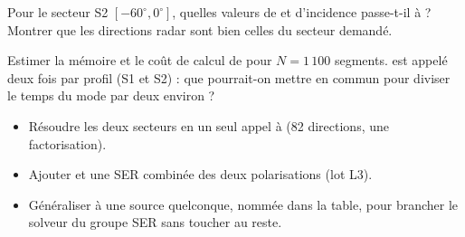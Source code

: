 \exercices
\begin{exercice}\label{ex:secteur}
Pour le secteur S2 $[-60^\circ,0^\circ]$, quelles valeurs de  et d'incidence  passe-t-il à  ? Montrer que les directions radar sont bien celles du secteur demandé.
\end{exercice}

\begin{exercice}
Estimer la mémoire et le coût de calcul de  pour $N=1\,100$ segments.  est appelé deux fois par profil (S1 et S2) : que pourrait-on mettre en commun pour diviser le temps du mode  par deux environ ?
\end{exercice}

\begin{pistes}
\begin{itemize}
\item Résoudre les deux secteurs en un seul appel à  (82 directions, une factorisation).
\item Ajouter  et une SER combinée des deux polarisations (lot L3).
\item Généraliser  à une source quelconque, nommée dans la table, pour brancher le solveur du groupe SER sans toucher au reste.
\end{itemize}
\end{pistes}
